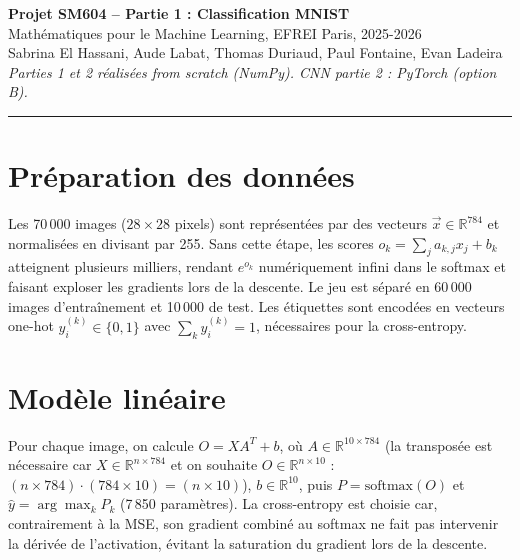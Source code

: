 \documentclass[10pt,a4paper]{article}
\begin{document}
\begin{center}
{\large\textbf{Projet SM604 -- Partie 1 : Classification MNIST}}\\[3pt]
{\small Mathématiques pour le Machine Learning, EFREI Paris, 2025-2026\\[2pt]
Sabrina El Hassani, Aude Labat, Thomas Duriaud, Paul Fontaine, Evan Ladeira\\[1pt]
\textit{Parties 1 et 2 réalisées from scratch (NumPy). CNN partie 2 : PyTorch (option B).}}
\end{center}

\vspace{-2pt}\rule{\linewidth}{0.4pt}\vspace{2pt}

\section{Préparation des données}

Les 70\,000 images ($28\times28$ pixels) sont représentées par des vecteurs
$\vec{x}\in\mathbb{R}^{784}$ et normalisées en divisant par 255.
Sans cette étape, les scores $o_k=\sum_j a_{k,j}x_j+b_k$ atteignent plusieurs milliers,
rendant $e^{o_k}$ numériquement infini dans le softmax
et faisant exploser les gradients lors de la descente.
Le jeu est séparé en 60\,000 images d'entraînement et 10\,000 de test.
Les étiquettes sont encodées en vecteurs one-hot
$y_i^{(k)}\in\{0,1\}$ avec $\sum_k y_i^{(k)}=1$, nécessaires pour la cross-entropy.

\section{Modèle linéaire}

Pour chaque image, on calcule $O=XA^T+b$,
où $A\in\mathbb{R}^{10\times784}$ (la transposée est nécessaire car
$X\in\mathbb{R}^{n\times784}$ et on souhaite $O\in\mathbb{R}^{n\times10}$ :
$(n\times784)\cdot(784\times10)=(n\times10)$),
$b\in\mathbb{R}^{10}$, puis $P=\mathrm{softmax}(O)$
et $\hat{y}=\arg\max_k P_k$ (7\,850 paramètres).
La cross-entropy est choisie car, contrairement à la MSE,
son gradient combiné au softmax ne fait pas intervenir la dérivée de l'activation,
évitant la saturation du gradient lors de la descente.
\end{document}
